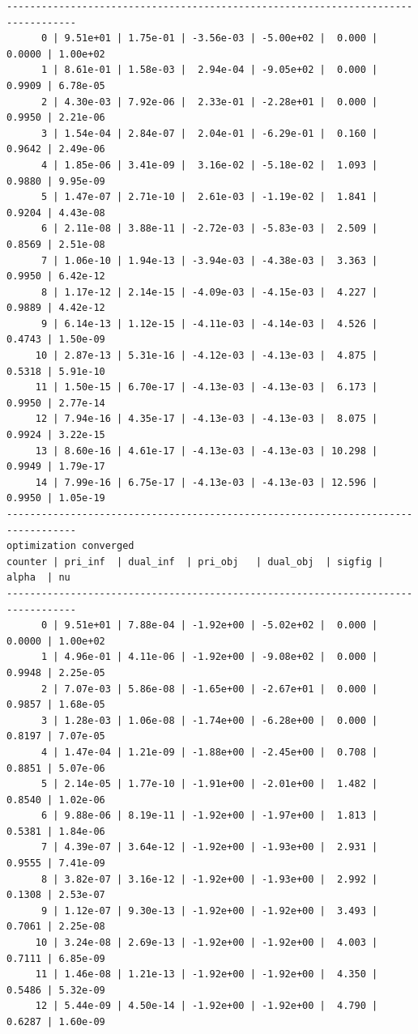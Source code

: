 \documentclass[
]{book}
\begin{document}
\begin{verbatim}
----------------------------------------------------------------------------------
      0 | 9.51e+01 | 1.75e-01 | -3.56e-03 | -5.00e+02 |  0.000 | 0.0000 | 1.00e+02
      1 | 8.61e-01 | 1.58e-03 |  2.94e-04 | -9.05e+02 |  0.000 | 0.9909 | 6.78e-05
      2 | 4.30e-03 | 7.92e-06 |  2.33e-01 | -2.28e+01 |  0.000 | 0.9950 | 2.21e-06
      3 | 1.54e-04 | 2.84e-07 |  2.04e-01 | -6.29e-01 |  0.160 | 0.9642 | 2.49e-06
      4 | 1.85e-06 | 3.41e-09 |  3.16e-02 | -5.18e-02 |  1.093 | 0.9880 | 9.95e-09
      5 | 1.47e-07 | 2.71e-10 |  2.61e-03 | -1.19e-02 |  1.841 | 0.9204 | 4.43e-08
      6 | 2.11e-08 | 3.88e-11 | -2.72e-03 | -5.83e-03 |  2.509 | 0.8569 | 2.51e-08
      7 | 1.06e-10 | 1.94e-13 | -3.94e-03 | -4.38e-03 |  3.363 | 0.9950 | 6.42e-12
      8 | 1.17e-12 | 2.14e-15 | -4.09e-03 | -4.15e-03 |  4.227 | 0.9889 | 4.42e-12
      9 | 6.14e-13 | 1.12e-15 | -4.11e-03 | -4.14e-03 |  4.526 | 0.4743 | 1.50e-09
     10 | 2.87e-13 | 5.31e-16 | -4.12e-03 | -4.13e-03 |  4.875 | 0.5318 | 5.91e-10
     11 | 1.50e-15 | 6.70e-17 | -4.13e-03 | -4.13e-03 |  6.173 | 0.9950 | 2.77e-14
     12 | 7.94e-16 | 4.35e-17 | -4.13e-03 | -4.13e-03 |  8.075 | 0.9924 | 3.22e-15
     13 | 8.60e-16 | 4.61e-17 | -4.13e-03 | -4.13e-03 | 10.298 | 0.9949 | 1.79e-17
     14 | 7.99e-16 | 6.75e-17 | -4.13e-03 | -4.13e-03 | 12.596 | 0.9950 | 1.05e-19
----------------------------------------------------------------------------------
optimization converged
counter | pri_inf  | dual_inf  | pri_obj   | dual_obj  | sigfig | alpha  | nu 
----------------------------------------------------------------------------------
      0 | 9.51e+01 | 7.88e-04 | -1.92e+00 | -5.02e+02 |  0.000 | 0.0000 | 1.00e+02
      1 | 4.96e-01 | 4.11e-06 | -1.92e+00 | -9.08e+02 |  0.000 | 0.9948 | 2.25e-05
      2 | 7.07e-03 | 5.86e-08 | -1.65e+00 | -2.67e+01 |  0.000 | 0.9857 | 1.68e-05
      3 | 1.28e-03 | 1.06e-08 | -1.74e+00 | -6.28e+00 |  0.000 | 0.8197 | 7.07e-05
      4 | 1.47e-04 | 1.21e-09 | -1.88e+00 | -2.45e+00 |  0.708 | 0.8851 | 5.07e-06
      5 | 2.14e-05 | 1.77e-10 | -1.91e+00 | -2.01e+00 |  1.482 | 0.8540 | 1.02e-06
      6 | 9.88e-06 | 8.19e-11 | -1.92e+00 | -1.97e+00 |  1.813 | 0.5381 | 1.84e-06
      7 | 4.39e-07 | 3.64e-12 | -1.92e+00 | -1.93e+00 |  2.931 | 0.9555 | 7.41e-09
      8 | 3.82e-07 | 3.16e-12 | -1.92e+00 | -1.93e+00 |  2.992 | 0.1308 | 2.53e-07
      9 | 1.12e-07 | 9.30e-13 | -1.92e+00 | -1.92e+00 |  3.493 | 0.7061 | 2.25e-08
     10 | 3.24e-08 | 2.69e-13 | -1.92e+00 | -1.92e+00 |  4.003 | 0.7111 | 6.85e-09
     11 | 1.46e-08 | 1.21e-13 | -1.92e+00 | -1.92e+00 |  4.350 | 0.5486 | 5.32e-09
     12 | 5.44e-09 | 4.50e-14 | -1.92e+00 | -1.92e+00 |  4.790 | 0.6287 | 1.60e-09

\end{verbatim}
\end{document}
